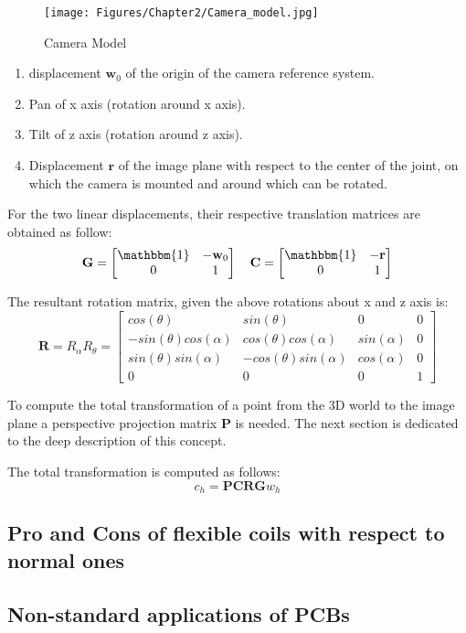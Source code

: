 \begin{figure}[th]
    \centering
    \texttt{[image: Figures/Chapter2/Camera\_model.jpg]}
    \caption[Camera Model]{Camera Model}
    \label{fig:CameraModel}
\end{figure}

\begin{enumerate}
    \item displacement $\textbf{w}_0$ of the origin of the camera reference system.
    \item Pan of x axis (rotation around x axis).
    \item Tilt of z axis (rotation around z axis).
    \item Displacement $\textbf{r}$ of the image plane with respect to the center of the joint, on which the camera is mounted and around which can be rotated.
\end{enumerate}

For the two linear displacements, their respective translation matrices are obtained as follow:
\begin{equation}
    \textbf{G} = 
    \begin{bmatrix}
    \mathbbm{1} & -\textbf{w}_0\\
    0 & 1\\
    \end{bmatrix}
    \quad 
    \textbf{C} = 
    \begin{bmatrix}
    \mathbbm{1} & -\textbf{r}\\
    0 & 1\\
    \end{bmatrix}
\end{equation}

The resultant rotation matrix, given the above rotations about x and z axis is:
\begin{equation}
    \textbf{R} = R_\alpha R_\theta = 
    \begin{bmatrix}
    cos(\theta) & sin(\theta) & 0 & 0\\
    -sin(\theta)cos(\alpha) & cos(\theta)cos(\alpha) & sin(\alpha) & 0\\
    sin(\theta)sin(\alpha) & -cos(\theta)sin(\alpha) & cos(\alpha) & 0\\
    0 & 0 & 0 & 1
    \end{bmatrix}
\end{equation}

To compute the total transformation of a point from the 3D world to the image plane a perspective projection matrix $\textbf{P}$ is needed. The next section is dedicated to the deep description of this concept.

The total transformation is computed as follows:
\begin{equation}
    c_h = \textbf{PCRG}w_h
\end{equation}

\subsection{Pro and Cons of flexible coils with respect to normal ones}

\subsection{Non-standard applications of PCBs}
